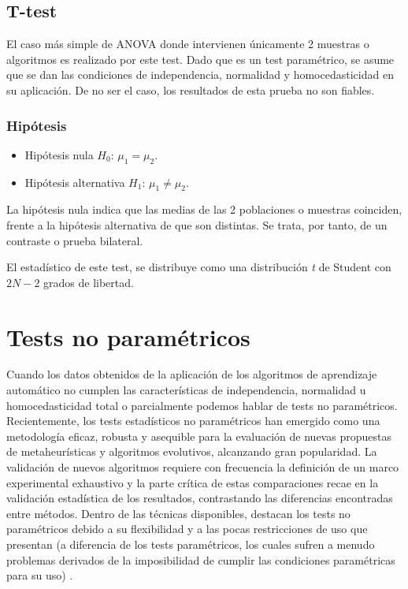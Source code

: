 
\subsection{T-test}
El caso más simple de ANOVA donde intervienen únicamente 2 muestras o algoritmos es realizado por este test.
Dado que es un test paramétrico, se asume que se dan las condiciones de independencia, normalidad y homocedasticidad
en su aplicación. De no ser el caso, los resultados de esta prueba no son fiables.

\subsubsection{Hipótesis}
\begin{itemize}
\item Hipótesis nula $H_0$: $\mu_1 = \mu_2$.
\item Hipótesis alternativa $H_1$: $\mu_1 \neq \mu_2$.
\end{itemize}
La hipótesis nula indica que las medias de las 2 poblaciones o muestras coinciden, frente a la hipótesis alternativa
de que son distintas. Se trata, por tanto, de un contraste o prueba bilateral.

El estadístico de este test, se distribuye como una distribución \textit{t} de Student con $2N-2$ grados de libertad.



\section{Tests no paramétricos} \label{no_parametricos}
Cuando los datos obtenidos de la aplicación de los algoritmos de aprendizaje automático no cumplen las
características de independencia, normalidad u homocedasticidad total o parcialmente podemos hablar de tests
no paramétricos. Recientemente, los tests estadísticos no paramétricos han emergido como una metodología
eficaz, robusta y asequible para la evaluación de nuevas propuestas de metaheurísticas y algoritmos evolutivos,
alcanzando gran popularidad. La validación de nuevos algoritmos requiere con frecuencia la definición
de un marco experimental exhaustivo y la parte crítica de estas comparaciones recae en la validación
estadística de los resultados, contrastando las diferencias encontradas entre métodos. Dentro de las técnicas
disponibles, destacan los tests no paramétricos debido a su flexibilidad y a las pocas restricciones de
uso que presentan (a diferencia de los tests paramétricos, los cuales sufren a menudo problemas derivados
de la imposibilidad de cumplir las condiciones paramétricas para su uso) \cite{no_parametricos}.

